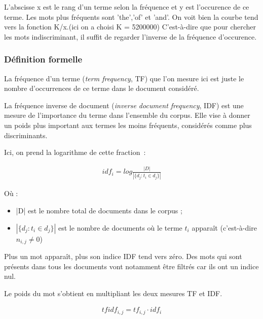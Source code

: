 \documentclass[a4paper, 12pt]{article}
\begin{document}
L'abscisse x est le rang d'un terme selon la fréquence et y est l'occurence de ce terme. Les mots plus fréquents sont 'the','of' et 'and'. On voit bien la courbe tend vers la fonction K/x.(ici on a choisi K = 5200000) C'est-à-dire que pour chercher les mots indiscriminant, il suffit de regarder l'inverse de la fréquence d'occurence.

\subsubsection{Définition formelle}

\begin{definition}[TF]
 La fréquence d'un terme (\textit{term frequency}, TF) que l'on mesure ici est juste le nombre d'occurrences de ce terme dans le document considéré.
\end{definition}

\begin{definition}[IDF]
 La fréquence inverse de document (\textit{inverse document frequency}, IDF) est une mesure de l'importance du terme dans l'ensemble du corpus. Elle vise à donner un poids plus important aux termes les moins fréquents, considérés comme plus discriminants.
\end{definition}

Ici, on prend la logarithme de cette fraction~:

\begin{align}
 idf_{i} =  log \frac{|D|}{|\{d_{j}: t_{i} \in d_{j}\}|}
\end{align}

Où : 
\begin{itemize}
 \item |D| est le nombre total de documents dans le corpus ;
 \item $|\{d_{j} : t_{i} \in d_{j}\}|$ est le nombre de documents où le terme  $t_{i}$  apparaît (c'est-à-dire  $n_{i,j} \neq 0$)
\end{itemize}

Plus un mot apparaît, plus son indice IDF tend vers zéro. Des mots qui sont présents dans tous les documents vont notamment être filtrés car ils ont un indice nul.

\begin{definition}[TF-IDF]
Le poids du mot s'obtient en multipliant les deux mesures TF et IDF.
\end{definition}

\begin{align}
 tfidf_{i,j} = tf_{i,j} \cdot  idf_{i}
\end{align}
\end{document}
